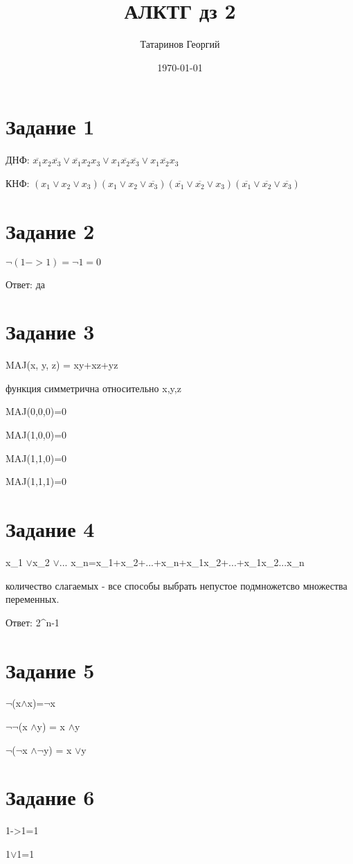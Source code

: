\documentclass[a4paper, 12pt]{article}
\title{АЛКТГ дз 2}
\author{Татаринов Георгий}
\date{\today}
\newcommand{\dand}{$\land$}
\newcommand{\dor}{$\lor$}
\newcommand{\dnot}{$\neg$}
\begin{document}
	\maketitle
	\section*{Задание 1}

		ДНФ: $ \overline{x_1} x_2 \overline{x_3} \vee \overline{x_1} x_2 x_3 \vee x_1 \overline{x_2} \overline{x_3} \vee x_1 \overline{x_2} x_3$

		КНФ: $ (x_1 \vee x_2 \vee x_3)(x_1 \vee x_2 \vee \overline{x_3})(\overline{x_1} \vee \overline{x_2} \vee x_3)(\overline{x_1} \vee \overline{x_2} \vee \overline{x_3})$

	\section*{Задание 2}
		$\neg (1->1)=\neg 1 =0$

		Ответ: да
	\section*{Задание 3}
		MAJ(x, y, z) = xy+xz+yz

		функция симметрична относительно x,y,z

		MAJ(0,0,0)=0

		MAJ(1,0,0)=0

		MAJ(1,1,0)=0

		MAJ(1,1,1)=0
	\section*{Задание 4}
		x_1 \dor x_2 \dor ... x_n=x_1+x_2+...+x_n+x_1x_2+...+x_1x_2...x_n

		количество слагаемых - все способы выбрать непустое подмножетсво множества переменных.

		Ответ: 2^n-1
	\section*{Задание 5}
		\dnot(x\dand x)=\dnot x

		\dnot \dnot(x \dand y) = x \dand y

		\dnot (\dnot x \dand \dnot y) = x \dor y
	\section*{Задание 6}
		1->1=1

		1\dor1=1
\end{document}
